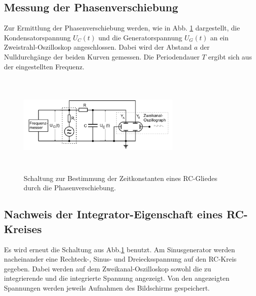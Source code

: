 \subsection{Messung der Phasenverschiebung}
Zur Ermittlung der Phasenverschiebung werden, wie in Abb. \ref{fig:4c} dargestellt, die Kondensatorspannung $U_{C}(t)$ 
und die Generatorspannung $U_{G}(t)$ an ein Zweistrahl-Oszilloskop angeschlossen. Dabei wird der Abstand $a$ der 
Nulldurchgänge der beiden Kurven gemessen. Die Periodendauer $T$ ergibt sich aus der eingestellten Frequenz.%
\begin{figure}
  \centering
  \includegraphics[width= 8cm, height=5cm]{build/4c.png}
  \caption{Schaltung zur Bestimmung der Zeitkonstanten eines RC-Gliedes durch die Phasenverschiebung.}
  \label{fig:4c}
\end{figure}

\subsection{Nachweis der Integrator-Eigenschaft eines RC-Kreises}
Es wird erneut die Schaltung aus Abb.\ref{fig:4c} benutzt. Am Sinusgenerator werden nacheinander eine Rechteck-, 
Sinus- und Dreiecksspannung auf den RC-Kreis gegeben. Dabei werden auf dem Zweikanal-Oszilloskop sowohl die 
zu integrierende und die integrierte Spannung angezeigt. Von den angezeigten Spannungen werden jeweils Aufnahmen
des Bildschirms gespeichert. 
